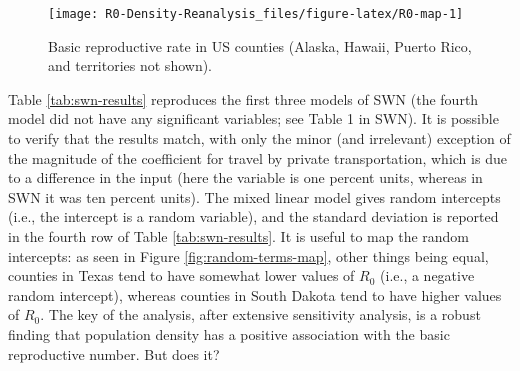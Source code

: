 \documentclass[10pt,letterpaper]{article}
\begin{document}
\begin{figure}
\texttt{[image: R0-Density-Reanalysis\_files/figure-latex/R0-map-1]} \caption{\label{fig:R0-map}Basic reproductive rate in US counties (Alaska, Hawaii, Puerto Rico, and territories not shown).}\label{fig:R0-map}
\end{figure}

Table \ref{tab:swn-results} reproduces the first three models of SWN
(the fourth model did not have any significant variables; see Table 1 in
SWN). It is possible to verify that the results match, with only the
minor (and irrelevant) exception of the magnitude of the coefficient for
travel by private transportation, which is due to a difference in the
input (here the variable is one percent units, whereas in SWN it was ten
percent units). The mixed linear model gives random intercepts (i.e.,
the intercept is a random variable), and the standard deviation is
reported in the fourth row of Table \ref{tab:swn-results}. It is useful
to map the random intercepts: as seen in Figure
\ref{fig:random-terms-map}, other things being equal, counties in Texas
tend to have somewhat lower values of \(R_0\) (i.e., a negative random
intercept), whereas counties in South Dakota tend to have higher values
of \(R_0\). The key of the analysis, after extensive sensitivity
analysis, is a robust finding that population density has a positive
association with the basic reproductive number. But does it?

\begin{table}

\caption{\label{tab:tabulate-swn-results}\label{tab:swn-results}Reproducing SWN: Models 1-3}
\centering
{}
\end{table}
\end{document}
